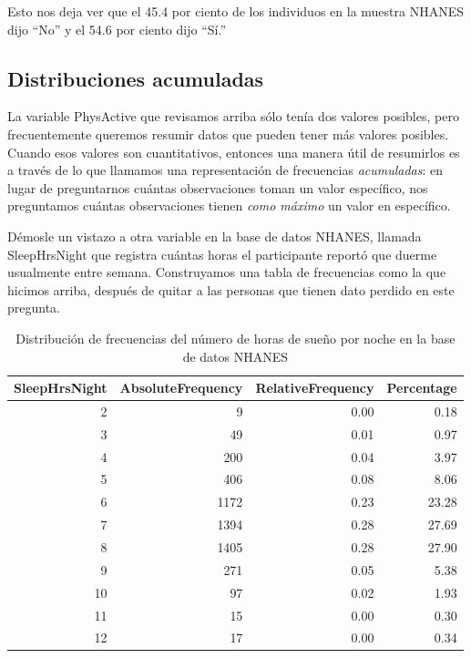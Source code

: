 \documentclass[
  12pt,
]{book}
\theoremstyle{definition}
\theoremstyle{definition}
\theoremstyle{definition}
\theoremstyle{remark}
\begin{document}
Esto nos deja ver que el 45.4 por ciento de los individuos en la muestra NHANES dijo ``No'' y el 54.6 por ciento dijo ``Sí.''

\hypertarget{cumulative-distributions}{%
\subsection{Distribuciones acumuladas}\label{cumulative-distributions}}

La variable PhysActive que revisamos arriba sólo tenía dos valores posibles, pero frecuentemente queremos resumir datos que pueden tener más valores posibles. Cuando esos valores son cuantitativos, entonces una manera útil de resumirlos es a través de lo que llamamos una representación de frecuencias \emph{acumuladas}: en lugar de preguntarnos cuántas observaciones toman un valor específico, nos preguntamos cuántas observaciones tienen \emph{como máximo} un valor en específico.

Démosle un vistazo a otra variable en la base de datos NHANES, llamada SleepHrsNight que registra cuántas horas el participante reportó que duerme usualmente entre semana. Construyamos una tabla de frecuencias como la que hicimos arriba, después de quitar a las personas que tienen dato perdido en este pregunta.

\begin{table}

\caption{\label{tab:unnamed-chunk-7}Distribución de frecuencias del número de horas de sueño por noche en la base de datos NHANES}
\centering
\begin{tabular}[t]{r|r|r|r}
\hline
SleepHrsNight & AbsoluteFrequency & RelativeFrequency & Percentage\\
\hline
2 & 9 & 0.00 & 0.18\\
\hline
3 & 49 & 0.01 & 0.97\\
\hline
4 & 200 & 0.04 & 3.97\\
\hline
5 & 406 & 0.08 & 8.06\\
\hline
6 & 1172 & 0.23 & 23.28\\
\hline
7 & 1394 & 0.28 & 27.69\\
\hline
8 & 1405 & 0.28 & 27.90\\
\hline
9 & 271 & 0.05 & 5.38\\
\hline
10 & 97 & 0.02 & 1.93\\
\hline
11 & 15 & 0.00 & 0.30\\
\hline
12 & 17 & 0.00 & 0.34\\
\hline
\end{tabular}
\end{table}
\end{document}
